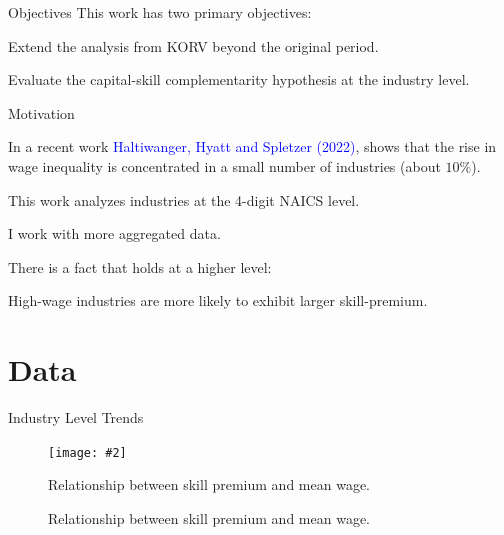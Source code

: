 \documentclass[notes,11pt, aspectratio=169]{beamer}
\makeatletter
\newcommand{\fitimage}[2][\@nil]{
 \begin{figure}
 \begin{adjustbox}{width=0.9\textwidth, totalheight=\textheight-2\baselineskip-2\baselineskip,keepaspectratio}
 \texttt{[image: \#2]}
 \end{adjustbox}
 \def\tmp{#1}%
 \ifx\tmp\@nnil
 \else
 \caption{#1}
 \fi
 \end{figure}
}
\newenvironment{wideitemize}{\itemize\addtolength{\itemsep}{10pt}}{\enditemize}
\makeatother
\begin{document}
\begin{frame}{Objectives}
This work has two primary objectives:
\vspace*{0.4cm}
\begin{wideitemize}
 \item Extend the analysis from KORV beyond the original period.
 \item Evaluate the capital-skill complementarity hypothesis at the industry level.
\end{wideitemize}
\vspace*{1cm}
\end{frame}


\begin{frame}{Motivation}
\begin{wideitemize}
 \item In a recent work \textcolor{blue}{Haltiwanger, Hyatt and Spletzer (2022)}, shows that the rise in wage inequality is concentrated in a small number of industries (about $10\%$).
 \begin{wideitemize}
 \item This work analyzes industries at the 4-digit NAICS level.
 \item I work with more aggregated data.
 \end{wideitemize}
 \item There is a fact that holds at a higher level:
 \begin{wideitemize}
 \item High-wage industries are more likely to exhibit larger skill-premium.
 \end{wideitemize}
\end{wideitemize}
\end{frame}

\section*{Data}

\begin{frame}{Industry Level Trends}
 \begin{center}
 \fitimage[Relationship between skill premium and mean wage.]{../images/correlations_wage_SP_slides.pdf}
 \end{center}
\end{frame}

\end{document}
